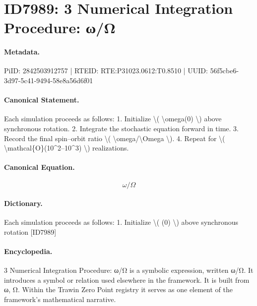 \section*{ID7989: 3 Numerical Integration Procedure: ω/Ω}
\paragraph{Metadata.}
PiID: 2842503912757 | RTEID: RTE:P31023.0612:T0.8510 | UUID: 56f5cbe6-3d97-5c41-9494-58e8a56d6f01

\paragraph{Canonical Statement.}
Each simulation proceeds as follows: 1. Initialize \textbackslash{}( \textbackslash{}omega(0) \textbackslash{}) above synchronous rotation. 2. Integrate the stochastic equation forward in time. 3. Record the final spin–orbit ratio \textbackslash{}( \textbackslash{}omega/\textbackslash{}Omega \textbackslash{}). 4. Repeat for \textbackslash{}( \textbackslash{}mathcal\{O\}(10\textasciicircum{}2–10\textasciicircum{}3) \textbackslash{}) realizations.

\paragraph{Canonical Equation.}
\[
\omega/\Omega
\]

\paragraph{Dictionary.}
Each simulation proceeds as follows: 1. Initialize \textbackslash{}( (0) \textbackslash{}) above synchronous rotation [ID7989]

\paragraph{Encyclopedia.}
3 Numerical Integration Procedure: ω/Ω is a symbolic expression, written ω/Ω. It introduces a symbol or relation used elsewhere in the framework. It is built from ω, Ω. Within the Trawin Zero Point registry it serves as one element of the framework's mathematical narrative.
